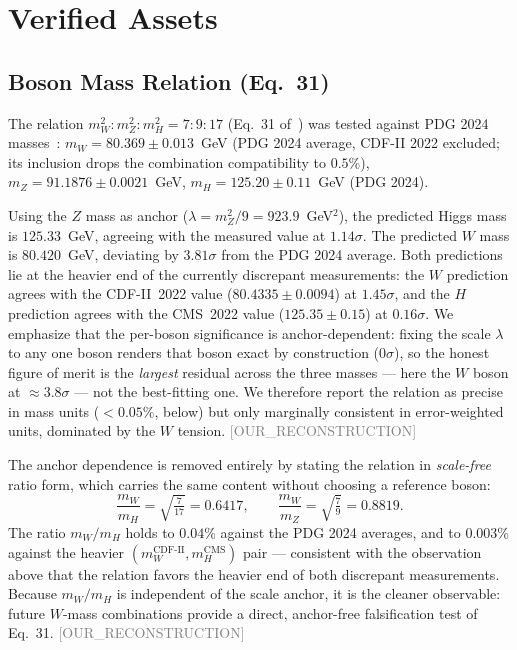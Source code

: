 \documentclass[twocolumn,prd,amsmath,amssymb,floatfix]{revtex4-2}
\newcommand{\reconstruction}{\textcolor{gray}{\small[OUR\_RECONSTRUCTION]}}
\begin{document}
\section{Verified Assets}
\label{sec:assets}

\subsection{Boson Mass Relation (Eq.~31)}
\label{ssec:bosons}

The relation $m_W^2 : m_Z^2 : m_H^2 = 7:9:17$ (Eq.~31 of~\cite{buckholtz2026})
was tested against PDG 2024 masses~\cite{pdg2024}:
$m_W = 80.369 \pm 0.013$~GeV (PDG 2024 average, CDF-II 2022 excluded;
its inclusion drops the combination compatibility to $0.5\%$),
$m_Z = 91.1876 \pm 0.0021$~GeV,
$m_H = 125.20 \pm 0.11$~GeV (PDG 2024).

Using the $Z$ mass as anchor ($\lambda = m_Z^2/9 = 923.9$~GeV$^2$), the
predicted Higgs mass is $125.33$~GeV, agreeing with the measured value at
$1.14\sigma$.  The predicted $W$ mass is $80.420$~GeV, deviating by
$3.81\sigma$ from the PDG 2024 average.  Both predictions lie at the heavier
end of the currently discrepant measurements: the $W$ prediction agrees with
the CDF-II~2022 value ($80.4335 \pm 0.0094$) at $1.45\sigma$, and the $H$
prediction agrees with the CMS~2022 value ($125.35 \pm 0.15$) at $0.16\sigma$.
We emphasize that the per-boson significance is anchor-dependent: fixing the
scale $\lambda$ to any one boson renders that boson exact by construction
($0\sigma$), so the honest figure of merit is the \emph{largest} residual
across the three masses --- here the $W$ boson at $\approx 3.8\sigma$ --- not
the best-fitting one. We therefore report the relation as precise in mass
units ($<0.05\%$, below) but only marginally consistent in error-weighted
units, dominated by the $W$ tension.
\reconstruction

The anchor dependence is removed entirely by stating the relation in
\emph{scale-free} ratio form, which carries the same content without choosing
a reference boson:
\begin{equation}
    \frac{m_W}{m_H} = \sqrt{\tfrac{7}{17}} = 0.6417, \qquad
    \frac{m_W}{m_Z} = \sqrt{\tfrac{7}{9}} = 0.8819 .
\end{equation}
The ratio $m_W/m_H$ holds to $0.04\%$ against the PDG 2024 averages, and to
$0.003\%$ against the heavier $(m_W^\mathrm{CDF\text{-}II}, m_H^\mathrm{CMS})$
pair --- consistent with the observation above that the relation favors the
heavier end of both discrepant measurements. Because $m_W/m_H$ is independent
of the scale anchor, it is the cleaner observable: future $W$-mass combinations
provide a direct, anchor-free falsification test of Eq.~31.
\reconstruction
\end{document}
